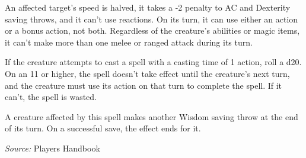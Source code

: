 \documentclass[10pt,twoside,twocolumn]{article}
\begin{document}
An affected target's speed is halved, it takes a -2 penalty to AC and Dexterity saving throws, and it can't use reactions. On its turn, it can use either an action or a bonus action, not both. Regardless of the creature's abilities or magic items, it can't make more than one melee or ranged attack during its turn.

If the creature attempts to cast a spell with a casting time of 1 action, roll a d20. On an 11 or higher, the spell doesn't take effect until the creature's next turn, and the creature must use its action on that turn to complete the spell. If it can't, the spell is wasted.

A creature affected by this spell makes another Wisdom saving throw at the end of its turn. On a successful save, the effect ends for it.



\textit{Source:} Players Handbook
\end{document}

